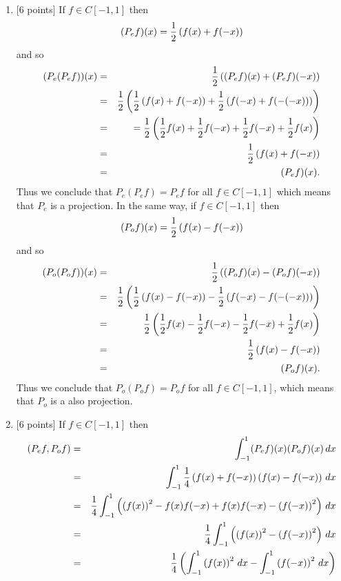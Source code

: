 \begin{solution}
\begin{enumerate}
\item {[6 points]} If $f\in C[-1,1]$ then
\[
(P_e f)(x) = {1 \over 2}\left(f(x)+f(-x)\right)
\]
and so
\begin{eqnarray*}
(P_e(P_e f))(x) &=& {1 \over 2}\left((P_ef)(x)+(P_ef)(-x)\right)
\\
&=& \displaystyle{{1 \over 2}\left({1\over 2}\left(f(x)+f(-x)\right)+{1 \over 2}\left(f(-x)+f(-(-x))\right)\right)}
\\
&=& = \displaystyle{{1 \over 2}\left({1\over 2}f(x)+{1\over 2}f(-x)+{1 \over 2}f(-x)+{1\over 2}f(x)\right)}
\\
&=& {1 \over 2}\left(f(x)+f(-x)\right)
\\
&=& (P_e f)(x).
\end{eqnarray*}
Thus we conclude that $P_e(P_e f) = P_e f$ for all $f\in C[-1,1]$ which means that $P_e$ is a projection. In the same way, if $f\in C[-1,1]$ then
\[
(P_o f)(x) = {1 \over 2}\left(f(x)-f(-x)\right)
\]
and so
\begin{eqnarray*}
(P_o(P_o f))(x) &=& {1 \over 2}\left((P_of)(x)-(P_of)(-x)\right)
\\
&=& \displaystyle{{1 \over 2}\left({1\over 2}\left(f(x)-f(-x)\right)-{1 \over 2}\left(f(-x)-f(-(-x))\right)\right)}
\\
&=& \displaystyle{{1 \over 2}\left({1\over 2}f(x)-{1\over 2}f(-x)-{1 \over 2}f(-x)+{1\over 2}f(x)\right)}
\\
&=& {1 \over 2}\left(f(x)-f(-x)\right)
\\
&=& (P_o f)(x).
\end{eqnarray*}
Thus we conclude that $P_o(P_o f) = P_o f$ for all $f\in C[-1,1]$, which means that $P_o$ is a also projection.
\\
\item {[6 points]} If $f\in C[-1,1]$ then
\begin{eqnarray*}
\ip{P_e f, P_o f} &=& \int_{-1}^1 (P_e f)(x) (P_o f)(x)\, d x
\\
&=& \int_{-1}^1 {1\over 4}\left(f(x)+f(-x)\right)\left(f(x)-f(-x)\right)\, d x
\\
&=& {1\over 4} \int_{-1}^1 \left(\left(f(x)\right)^2 - f(x) f(-x) + f(x) f(-x) - \left(f(-x)\right)^2\right)  \, dx
\\
&=& {1\over 4} \int_{-1}^1 \left(\left(f(x)\right)^2 - \left(f(-x)\right)^2\right)  \, dx
\\
&=& {1\over 4} \left(\int_{-1}^1 \left(f(x)\right)^2 \, dx - \int_{-1}^1 \left(f(-x)\right)^2  \, dx\right)

\end{eqnarray*}
\end{enumerate}
\end{solution}

